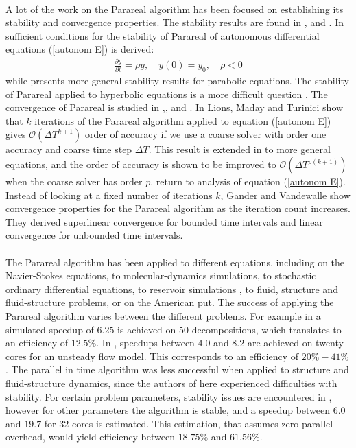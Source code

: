 \\
A lot of the work on the Parareal algorithm has been focused on establishing its stability and convergence properties. The stability results are found in \cite{staff2005stability},\cite{maday2007parareal} and \cite{bal2005convergence}. In \cite{staff2005stability,maday2007parareal} sufficient conditions for the stability of Parareal of autonomous differential equations (\ref{autonom E}) is derived:
\begin{align}
\frac{\partial y}{\partial t} =\rho y,\quad y(0)=y_0,\quad  \rho<0 \label{autonom E}
\end{align}
while \cite{bal2005convergence} presents more general stability results for parabolic equations. The stability of Parareal applied to hyperbolic equations is a more difficult question \cite{dai2013stable}. The convergence of Parareal is studied in \cite{lions2001resolution},\cite{bal2005convergence},\cite{gander2007analysis} and \cite{gander2007superlinear}. In \cite{lions2001resolution} Lions, Maday and Turinici show that $k$ iterations of the Parareal algorithm applied to equation (\ref{autonom E}) gives $\mathcal{O}(\Delta T^{k+1})$ order of accuracy if we use a coarse solver with order one accuracy and coarse time step $\Delta T$. This result is extended in \cite{bal2005convergence} to more general equations, and the order of accuracy is shown to be improved to $\mathcal{O}(\Delta T^{p(k+1)})$ when the coarse solver has order $p$. \cite{gander2007analysis,gander2007superlinear} return to analysis of equation (\ref{autonom E}). Instead of looking at a fixed number of iterations $k$, Gander and Vandewalle show convergence properties for the Parareal algorithm as the iteration count increases. They derived superlinear convergence for bounded time intervals and linear convergence for unbounded time intervals.
\\
\\
The Parareal algorithm has been applied to different equations, including on the Navier-Stokes equations\cite{fischer2005parareal}, to molecular-dynamics simulations\cite{baffico2002parallel}, to stochastic ordinary differential equations\cite{bal2003parallelization}, to reservoir simulations \cite{garrido2005convergent}, to fluid, structure and fluid-structure problems\cite{farhat2003time}, or on the American put\cite{bal2002parareal}. The success of applying the Parareal algorithm varies between the different problems. For example in \cite{bal2002parareal} a simulated speedup of $6.25$ is achieved on 50 decompositions, which translates to an efficiency of $12.5\%$. In \cite{farhat2003time}, speedups between $4.0$ and $8.2$ are achieved on twenty cores for an unsteady flow model. This corresponds to an efficiency of $20\%-41\%$. The parallel in time algorithm was less successful when applied to structure and fluid-structure dynamics, since the authors of \cite{farhat2003time} here experienced difficulties with stability. For certain problem parameters, stability issues are encountered in \cite{fischer2005parareal}, however for other parameters the algorithm is stable, and a speedup between $6.0$ and $19.7$ for $32$ cores is estimated. This estimation, that assumes zero parallel overhead, would yield efficiency between $18.75\%$ and $61.56\%$. 
